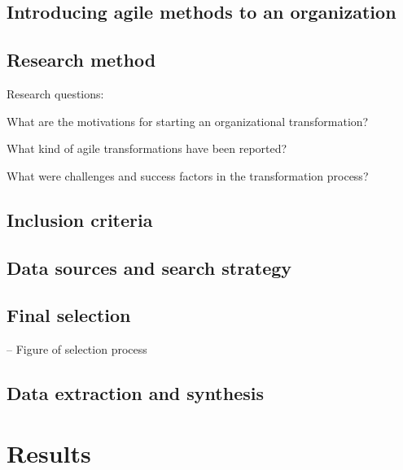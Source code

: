 \documentclass[lnbip]{svmultln}
\begin{document}
\lipsum[1]

\subsection{Introducing agile methods to an organization}

\lipsum[1]


\subsection{Research method}
\label{sec:method}

Research questions:

What are the motivations for starting an organizational transformation?

What kind of agile transformations have been reported?

What were challenges and success factors in the transformation process?

\subsection{Inclusion criteria}

\lipsum[1]

\subsection{Data sources and search strategy}

\lipsum[1]

\subsection{Final selection}

-- Figure of selection process

\lipsum[1]

\subsection{Data extraction and synthesis}

\lipsum[1]


\section{Results}
\label{sec:results}
\end{document}
